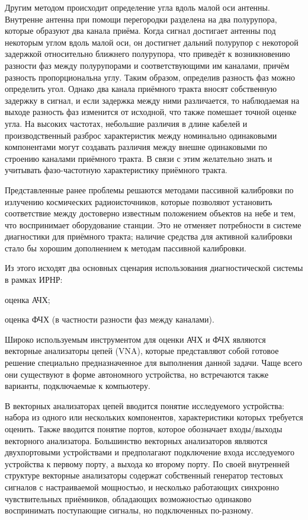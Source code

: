 \documentclass{report}
\begin{document}
Другим методом происходит определение угла вдоль малой оси антенны. Внутренне антенна при помощи перегородки разделена на два полурупора, которые образуют два канала приёма. Когда сигнал достигает антенны под некоторым углом вдоль малой оси, он достигнет дальний полурупор с некоторой задержкой относительно ближнего полурупора, что приведёт к возникновению разности фаз между полурупорами и соответствующими им каналами, причём разность пропорциональна углу. Таким образом, определив разность фаз можно определить угол. Однако два канала приёмного тракта вносят собственную задержку в сигнал, и если задержка между ними различается, то наблюдаемая на выходе разность фаз изменится от исходной, что также помешает точной оценке угла. На высоких частотах, небольшие различия в длине кабелей и производственный разброс характеристик между номинально одинаковыми компонентами могут создавать различия между внешне одинаковыми по строению каналами приёмного тракта. В связи с этим желательно знать и учитывать фазо-частотную характеристику приёмного тракта.

Представленные ранее проблемы решаются методами пассивной калибровки по излучению космических радиоисточников, которые позволяют установить соответствие между достоверно известным положением объектов на небе и тем, что воспринимает оборудование станции. Это не отменяет потребности в системе диагностики для приёмного тракта; наличие средства для активной калибровки стало бы хорошим дополнением к методам пассивной калибровки.

Из этого исходят два основных сценария использования диагностической системы в рамках ИРНР:

\begin{enummarker}
    \item оценка АЧХ;
    \item оценка ФЧХ (в частности разности фаз между каналами).
\end{enummarker}

Широко используемым инструментом для оценки АЧХ и ФЧХ являются векторные анализаторы цепей (VNA), которые представляют собой готовое решение специально предназначенное для выполнения данной задачи. Чаще всего они существуют в форме автономного устройства, но встречаются также варианты, подключаемые к компьютеру.

В векторных анализаторах цепей вводится понятие исследуемого устройства: набора из одного или нескольких компонентов, характеристики которых требуется оценить. Также вводится понятие портов, которое обозначает входы/выходы векторного анализатора. Большинство векторных анализаторов являются двухпортовыми устройствами и предполагают подключение входа исследуемого устройства к первому порту, а выхода ко второму порту. По своей внутренней структуре векторные анализаторы содержат собственный генератор тестовых сигналов с настраиваемой мощностью, и несколько работающих синхронно чувствительных приёмников, обладающих возможностью одинаково воспринимать поступающие сигналы, но подключенных по-разному.
\end{document}
